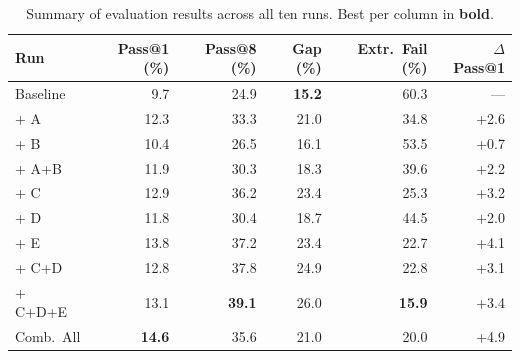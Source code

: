 \begin{table}[ht]
\centering
\caption{Summary of evaluation results across all ten runs. Best per column in \textbf{bold}.}
\label{tab:p4-summary-full}
\begin{tabular}{lrrrrr}
\toprule
Run & Pass@1 (\%) & Pass@8 (\%) & Gap (\%) & Extr.\ Fail (\%) & $\Delta$ Pass@1 \\
\midrule
Baseline & 9.7 & 24.9 & \textbf{15.2} & 60.3 & --- \\
\midrule
+ A & 12.3 & 33.3 & 21.0 & 34.8 & +2.6 \\
+ B & 10.4 & 26.5 & 16.1 & 53.5 & +0.7 \\
+ A+B & 11.9 & 30.3 & 18.3 & 39.6 & +2.2 \\
\midrule
+ C & 12.9 & 36.2 & 23.4 & 25.3 & +3.2 \\
+ D & 11.8 & 30.4 & 18.7 & 44.5 & +2.0 \\
+ E & 13.8 & 37.2 & 23.4 & 22.7 & +4.1 \\
+ C+D & 12.8 & 37.8 & 24.9 & 22.8 & +3.1 \\
+ C+D+E & 13.1 & \textbf{39.1} & 26.0 & \textbf{15.9} & +3.4 \\
\midrule
Comb.\ All & \textbf{14.6} & 35.6 & 21.0 & 20.0 & +4.9 \\
\bottomrule
\end{tabular}
\end{table}